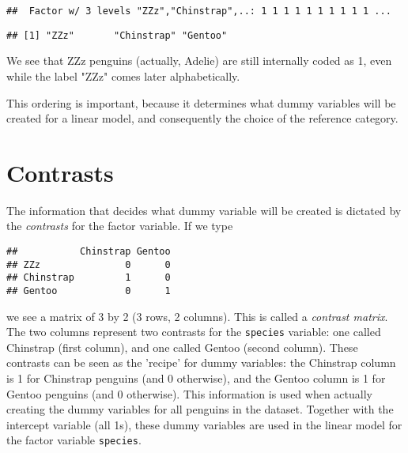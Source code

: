 \begin{knitrout}
\color{fgcolor}\begin{kframe}
\begin{alltt}
\hlopt{$}\hlstd{species)[}\hlstd{]} \hlkwb{<-} 
\hlopt{$}
\end{alltt}
\begin{verbatim}
##  Factor w/ 3 levels "ZZz","Chinstrap",..: 1 1 1 1 1 1 1 1 1 1 ...
\end{verbatim}
\begin{alltt}
\hlopt{$}
\end{alltt}
\begin{verbatim}
## [1] "ZZz"       "Chinstrap" "Gentoo"
\end{verbatim}
\end{kframe}
\end{knitrout}

We see that ZZz penguins (actually, Adelie) are still internally coded as 1, even while the label "ZZz" comes later alphabetically. 

This ordering is important, because it determines what dummy variables will be created for a linear model, and consequently the choice of the reference category. 

\section{Contrasts}


The information that decides what dummy variable will be created is dictated by the \textit{contrasts} for the factor variable. If we type

\begin{knitrout}
\color{fgcolor}\begin{kframe}
\begin{alltt}
\hlopt{$}
\end{alltt}
\begin{verbatim}
##           Chinstrap Gentoo
## ZZz               0      0
## Chinstrap         1      0
## Gentoo            0      1
\end{verbatim}
\end{kframe}
\end{knitrout}

we see a matrix of 3 by 2 (3 rows, 2 columns). This is called a \textit{contrast matrix}. The two columns represent two contrasts for the \texttt{species} variable: one called Chinstrap (first column), and one called Gentoo (second column). These contrasts can be seen as the 'recipe' for dummy variables: the Chinstrap column is 1 for Chinstrap penguins (and 0 otherwise), and the Gentoo column is 1 for Gentoo penguins (and 0 otherwise). This information is used when actually creating the dummy variables for all penguins in the dataset. Together with the intercept variable (all 1s), these dummy variables are used in the linear model for the factor variable \texttt{species}.  

